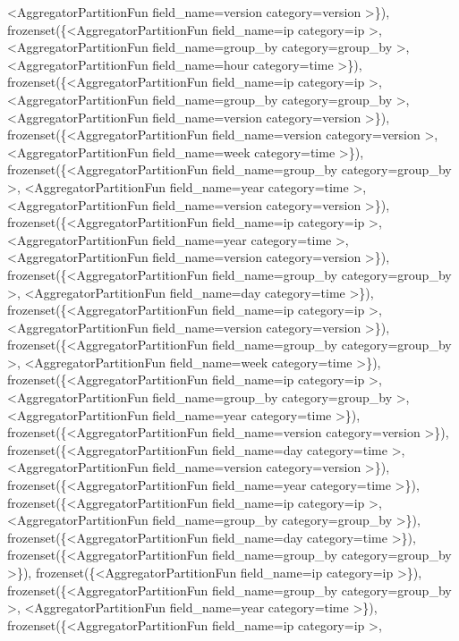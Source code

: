 \documentclass[letterpaper,10pt,english]{sphinxmanual}
\begin{document}
\begin{fulllineitems}
\begin{fulllineitems}
\textless{}AggregatorPartitionFun field\_name=version category=version \textgreater{}\}), frozenset(\{\textless{}AggregatorPartitionFun field\_name=ip category=ip \textgreater{}, \textless{}AggregatorPartitionFun field\_name=group\_by category=group\_by \textgreater{}, \textless{}AggregatorPartitionFun field\_name=hour category=time \textgreater{}\}), frozenset(\{\textless{}AggregatorPartitionFun field\_name=ip category=ip \textgreater{}, \textless{}AggregatorPartitionFun field\_name=group\_by category=group\_by \textgreater{}, \textless{}AggregatorPartitionFun field\_name=version category=version \textgreater{}\}), frozenset(\{\textless{}AggregatorPartitionFun field\_name=version category=version \textgreater{}, \textless{}AggregatorPartitionFun field\_name=week category=time \textgreater{}\}), frozenset(\{\textless{}AggregatorPartitionFun field\_name=group\_by category=group\_by \textgreater{}, \textless{}AggregatorPartitionFun field\_name=year category=time \textgreater{}, \textless{}AggregatorPartitionFun field\_name=version category=version \textgreater{}\}), frozenset(\{\textless{}AggregatorPartitionFun field\_name=ip category=ip \textgreater{}, \textless{}AggregatorPartitionFun field\_name=year category=time \textgreater{}, \textless{}AggregatorPartitionFun field\_name=version category=version \textgreater{}\}), frozenset(\{\textless{}AggregatorPartitionFun field\_name=group\_by category=group\_by \textgreater{}, \textless{}AggregatorPartitionFun field\_name=day category=time \textgreater{}\}), frozenset(\{\textless{}AggregatorPartitionFun field\_name=ip category=ip \textgreater{}, \textless{}AggregatorPartitionFun field\_name=version category=version \textgreater{}\}), frozenset(\{\textless{}AggregatorPartitionFun field\_name=group\_by category=group\_by \textgreater{}, \textless{}AggregatorPartitionFun field\_name=week category=time \textgreater{}\}), frozenset(\{\textless{}AggregatorPartitionFun field\_name=ip category=ip \textgreater{}, \textless{}AggregatorPartitionFun field\_name=group\_by category=group\_by \textgreater{}, \textless{}AggregatorPartitionFun field\_name=year category=time \textgreater{}\}), frozenset(\{\textless{}AggregatorPartitionFun field\_name=version category=version \textgreater{}\}), frozenset(\{\textless{}AggregatorPartitionFun field\_name=day category=time \textgreater{}, \textless{}AggregatorPartitionFun field\_name=version category=version \textgreater{}\}), frozenset(\{\textless{}AggregatorPartitionFun field\_name=year category=time \textgreater{}\}), frozenset(\{\textless{}AggregatorPartitionFun field\_name=ip category=ip \textgreater{}, \textless{}AggregatorPartitionFun field\_name=group\_by category=group\_by \textgreater{}\}), frozenset(\{\textless{}AggregatorPartitionFun field\_name=day category=time \textgreater{}\}), frozenset(\{\textless{}AggregatorPartitionFun field\_name=group\_by category=group\_by \textgreater{}\}), frozenset(\{\textless{}AggregatorPartitionFun field\_name=ip category=ip \textgreater{}\}), frozenset(\{\textless{}AggregatorPartitionFun field\_name=group\_by category=group\_by \textgreater{}, \textless{}AggregatorPartitionFun field\_name=year category=time \textgreater{}\}), frozenset(\{\textless{}AggregatorPartitionFun field\_name=ip category=ip \textgreater{}, 
\end{fulllineitems}
\end{fulllineitems}
\end{document}
